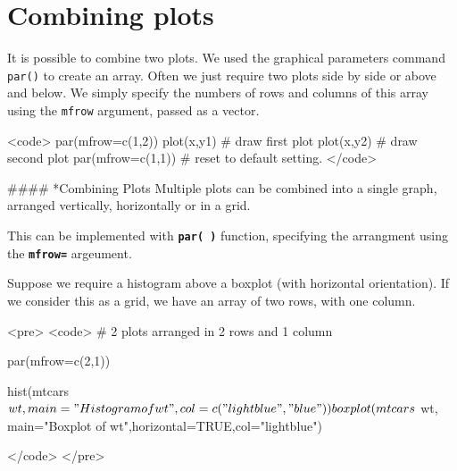 

\section*{Combining plots}
It is possible to combine two plots. We used the graphical parameters command \texttt{par()} to create an array. 
Often we just require two plots side by side or above and below. We simply specify the numbers of rows and columns of this array using the \texttt{mfrow} argument, passed as a vector.

<code>
par(mfrow=c(1,2))
plot(x,y1)			# draw first plot
plot(x,y2)			# draw second plot
par(mfrow=c(1,1))		# reset to default setting.
</code>

#### *{Combining Plots}
Multiple plots can be combined into a single graph, arranged vertically, horizontally or in a grid.

This can be implemented with \texttt{\textbf{par( )}} function, specifying the arrangment using the \texttt{\textbf{mfrow=}} argeument.

Suppose we require a histogram above a boxplot (with horizontal orientation). If we consider this as a grid, we have an array of two rows, with one column.

<pre>
<code>
# 2 plots arranged in 2 rows and 1 column


par(mfrow=c(2,1))


hist(mtcars$wt, main="Histogram of wt",col=c("lightblue","blue"))
boxplot(mtcars$
wt, main="Boxplot of wt",horizontal=TRUE,col="lightblue")

</code>
</pre>





